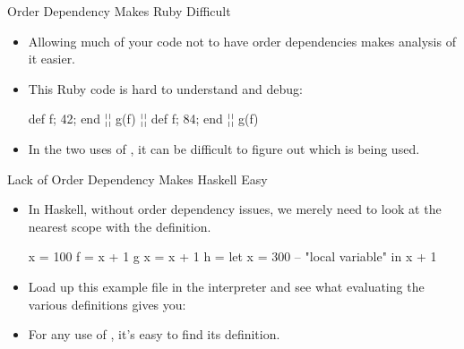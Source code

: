 \documentclass[xcolor=dvipsnames]{beamer}          %
\newcommand{\lO}[1]{\color{Black}{#1}}
\newcommand{\lH}[1]{\color{MidnightBlue}{#1}}
\newcommand{\lS}[1]{\color{Green}{#1}}
\begin{document}
\begin{frame}[fragile]{Order Dependency Makes Ruby Difficult}
\begin{itemize}
    \item Allowing much of your code not to have order dependencies makes
        analysis of it easier.
    \item This Ruby code is hard to understand and debug:
        \begin{rlisting}
            def f; 42; end
            ¦\lO{\# ... hundreds of lines of code here ... }¦
            g(f)
            ¦\lO{\# ... hundreds more lines of code here ... }¦
            def f; 84; end
            ¦\lO{\# ... and yet hundreds more lines of code here ... }¦
            g(f)
        \end{rlisting}
    \item In the two uses of , it can be difficult to figure out
        which  is being used.
\end{itemize}
\end{frame}


\begin{frame}[fragile]{Lack of Order Dependency Makes Haskell Easy}
\begin{itemize}
    \item In Haskell, without order dependency issues, we merely need to
        look at the nearest scope with the definition.
        \begin{hlisting}
            x   = 100
            f   = x + 1
            g x = x + 1
            h   =  let x = 300  -- "local variable"
                    in x + 1
        \end{hlisting}
    \item Load up this example file in the interpreter and see what
        evaluating the various definitions gives you:
    \item For any use of , it's easy to find its definition.
\end{itemize}
\end{frame}
\end{document}
